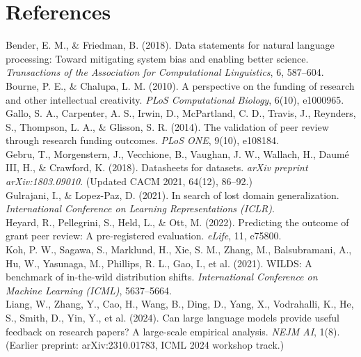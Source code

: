 \documentclass[11pt]{article}
\begin{document}
\section*{References}
\small

\noindent Bender, E. M., \& Friedman, B. (2018). Data statements for natural language processing: Toward mitigating system bias and enabling better science. \emph{Transactions of the Association for Computational Linguistics}, 6, 587--604.\\

\noindent Bourne, P. E., \& Chalupa, L. M. (2010). A perspective on the funding of research and other intellectual creativity. \emph{PLoS Computational Biology}, 6(10), e1000965.\\

\noindent Gallo, S. A., Carpenter, A. S., Irwin, D., McPartland, C. D., Travis, J., Reynders, S., Thompson, L. A., \& Glisson, S. R. (2014). The validation of peer review through research funding outcomes. \emph{PLoS ONE}, 9(10), e108184.\\

\noindent Gebru, T., Morgenstern, J., Vecchione, B., Vaughan, J. W., Wallach, H., Daumé III, H., \& Crawford, K. (2018). Datasheets for datasets. \emph{arXiv preprint arXiv:1803.09010}. (Updated CACM 2021, 64(12), 86--92.)\\

\noindent Gulrajani, I., \& Lopez-Paz, D. (2021). In search of lost domain generalization. \emph{International Conference on Learning Representations (ICLR)}.\\

\noindent Heyard, R., Pellegrini, S., Held, L., \& Ott, M. (2022). Predicting the outcome of grant peer review: A pre-registered evaluation. \emph{eLife}, 11, e75800.\\

\noindent Koh, P. W., Sagawa, S., Marklund, H., Xie, S. M., Zhang, M., Balsubramani, A., Hu, W., Yasunaga, M., Phillips, R. L., Gao, I., et al. (2021). WILDS: A benchmark of in-the-wild distribution shifts. \emph{International Conference on Machine Learning (ICML)}, 5637--5664.\\

\noindent Liang, W., Zhang, Y., Cao, H., Wang, B., Ding, D., Yang, X., Vodrahalli, K., He, S., Smith, D., Yin, Y., et al. (2024). Can large language models provide useful feedback on research papers? A large-scale empirical analysis. \emph{NEJM AI}, 1(8). (Earlier preprint: arXiv:2310.01783, ICML 2024 workshop track.)\\
\end{document}
